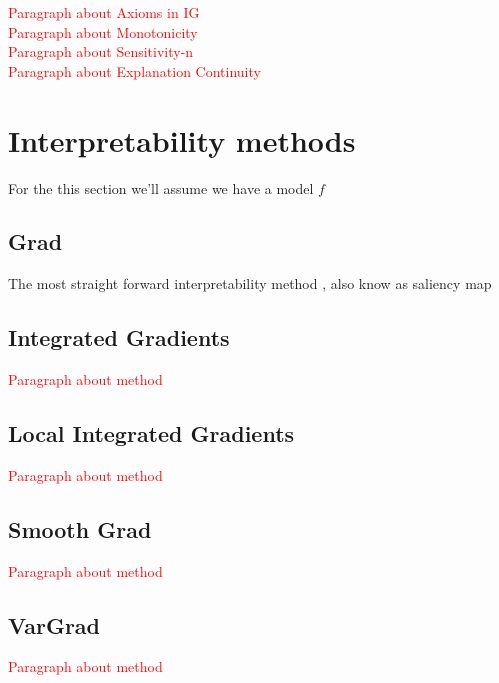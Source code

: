 \documentclass[12pt]{report}
\begin{document}
\textcolor{red}{Paragraph about Axioms in IG} \cite{DBLP:journals/corr/SundararajanTY17}\\

\textcolor{red}{Paragraph about Monotonicity } \cite{DBLP:journals/corr/abs-2007-07584} \\

\textcolor{red}{Paragraph about Sensitivity-n} \cite{https://doi.org/10.48550/arxiv.1711.06104} \\

\textcolor{red}{Paragraph about Explanation Continuity} \cite{DBLP:journals/corr/MontavonSM17}
\newpage
\section{Interpretability methods}

For the this section we'll assume we have a model $f$

\subsection{Grad }
	The most straight forward interpretability method \cite{baehrens2010explain} \cite{https://doi.org/10.48550/arxiv.1312.6034}, also know as saliency map 

\subsection{Integrated Gradients}

\textcolor{red}{Paragraph about method} \cite{DBLP:journals/corr/SundararajanTY17}

\subsection{Local Integrated Gradients}
\textcolor{red}{Paragraph about method} \cite{https://doi.org/10.48550/arxiv.1711.06104}


\subsection{Smooth Grad}

\textcolor{red}{Paragraph about method} \cite{DBLP:journals/corr/SmilkovTKVW17}

\subsection{VarGrad}

\textcolor{red}{Paragraph about method} \ \cite{DBLP:journals/corr/abs-1810-03307}
\end{document}
